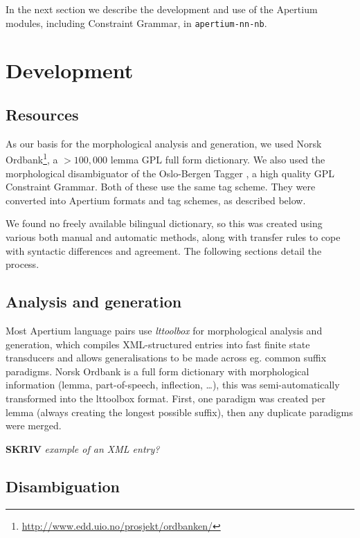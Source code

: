 \documentclass[11pt]{article}
\newcommand{\comment}[1]{\textbf{SKRIV} {\it #1}}
\begin{document}
In the next section we describe the development and use of the
Apertium modules, including Constraint Grammar, in {\tt apertium-nn-nb}.

\section{Development}

  \label{sec:development}
\subsection{Resources}

As our basis for the morphological analysis and generation, we used
Norsk
Ordbank\footnote{\href{http://www.edd.uio.no/prosjekt/ordbanken/}{http://www.edd.uio.no/prosjekt/ordbanken/}
}, a $>100,000$ lemma GPL full form dictionary. We also used the
morphological disambiguator of the Oslo-Bergen Tagger
\citep{hagen2000cbt}, a high quality GPL Constraint Grammar. Both of
these use the same tag scheme. They were converted into Apertium
formats and tag schemes, as described below.

We found no freely available bilingual dictionary, so this was created
using various both manual and automatic methods, along with transfer
rules to cope with syntactic differences and agreement. The following
sections detail the process.

\subsection{Analysis and generation}

Most Apertium language pairs use \emph{lttoolbox} for morphological
analysis and generation, which compiles XML-structured entries into
fast finite state transducers and allows generalisations to be made
across eg. common suffix paradigms. Norsk Ordbank is a full form
dictionary with morphological information (lemma, part-of-speech,
inflection, \ldots{}), this was semi-automatically transformed into
the lttoolbox format. First, one paradigm was created per lemma
(always creating the longest possible suffix), then any duplicate
paradigms were merged. 

\comment{ example of an XML entry?\\}


\subsection{Disambiguation}
\end{document}
